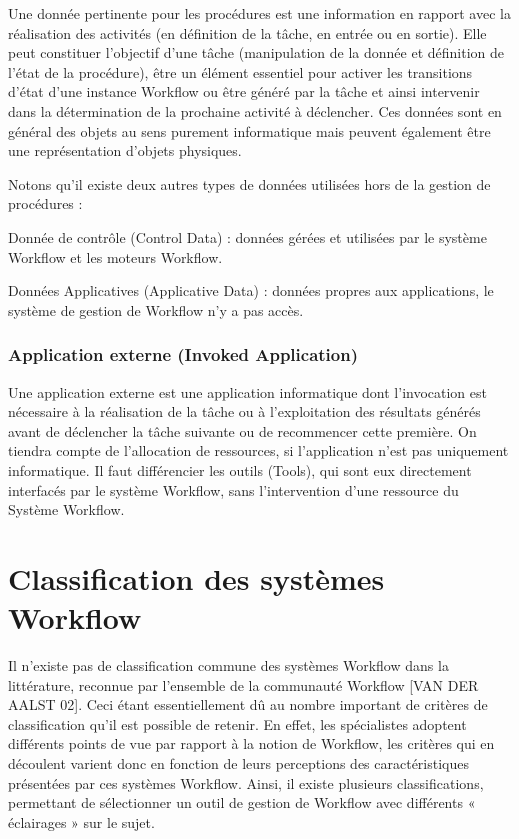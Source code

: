  	 Une donnée pertinente pour les procédures est une information en rapport avec la réalisation des activités (en définition de la tâche, en entrée ou en sortie). Elle peut constituer l’objectif d’une tâche (manipulation de la donnée et définition de l’état de la procédure), être un élément essentiel pour activer les transitions d’état d’une instance Workflow ou être généré par la tâche et ainsi intervenir dans la détermination de la prochaine activité à déclencher. Ces données sont en général des objets au sens purement informatique mais peuvent également être une représentation d’objets physiques. 
 	 
 	 Notons qu’il existe deux autres types de données utilisées hors de la gestion de procédures : 
 	 
 	 Donnée de contrôle (Control Data) : données gérées et utilisées par le système Workflow et les moteurs Workflow.
 	 
 	 Données Applicatives (Applicative Data) : données propres aux applications, le système de gestion de Workflow n’y a pas accès. 
 	 
 	 \subsubsection{ Application externe (Invoked Application) }
 	 Une application externe est une application informatique dont l’invocation est nécessaire à la réalisation de la tâche ou à l’exploitation des résultats générés avant de déclencher la tâche suivante ou de recommencer cette première. On tiendra compte de l’allocation de ressources, si l’application n’est pas uniquement informatique. Il faut différencier les outils (Tools), qui sont eux directement interfacés par le système Workflow, sans l’intervention d’une ressource du Système Workflow.
 	 
 	 
 	 
 	 
 	 
 	 
 	 

\section{Classification des systèmes Workflow}

Il n’existe pas de classification commune des systèmes Workflow dans la littérature, reconnue par l’ensemble de la communauté Workflow [VAN DER AALST 02]. Ceci étant essentiellement dû au nombre important de critères de classification qu’il est possible de retenir.
En effet, les spécialistes adoptent différents points de vue par rapport à la notion de Workflow, les critères qui en découlent varient donc en fonction de leurs perceptions des caractéristiques présentées par ces systèmes Workflow. Ainsi, il existe plusieurs classifications, permettant de sélectionner un outil de gestion de Workflow avec différents « éclairages » sur le sujet.

